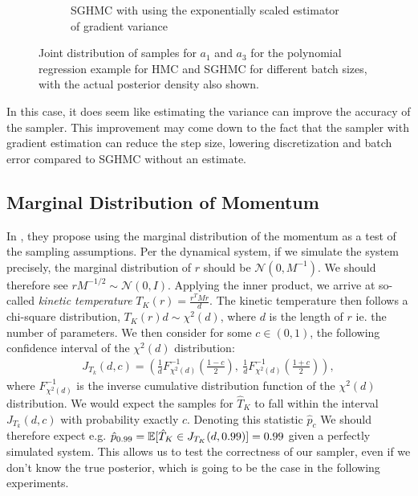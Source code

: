 \begin{figure}[htbp]
\begin{subfigure}[t]{0.45\linewidth}
        \caption{SGHMC with using the exponentially scaled estimator of gradient variance}
    \end{subfigure}
    \caption{Joint distribution of samples for $a_1$ and $a_3$ for the polynomial regression example for HMC and SGHMC for different batch sizes, with the actual posterior density also shown.}
    \label{fig:simualted_var_est_joint_comp}
\end{figure}
In this case, it does seem like estimating the variance can improve the accuracy of the sampler.
This improvement may come down to the fact that the sampler with gradient estimation can reduce the step size, lowering discretization and batch error compared to SGHMC without an estimate. 

\subsection{Marginal Distribution of Momentum}

In \autocite{wenzel_how_2020}, they propose using the marginal distribution of the momentum as a test of the sampling assumptions. 
Per the dynamical system, if we simulate the system precisely, the marginal distribution of $r$ should be $\mathcal{N}(0, M^{-1})$. 
We should therefore see $r M^{-1/2} \sim \mathcal{N}(0, I)$. 
Applying the inner product, we arrive at so-called \emph{kinetic temperature} $T_K(r) = \frac{r^T M r}{d}$.
The kinetic temperature then follows a chi-square distribution, $T_K(r)d\sim \chi^2(d)$, where $d$ is the length of $r$ ie. the number of parameters. 
We then consider for some $c\in (0, 1)$, the following confidence interval of  the $\chi^2(d)$ distribution:
\begin{align}
    J_{T_k}(d, c) = \left(\frac{1}{d} F_{\chi^2(d)}^{-1}\left( \frac{1-c}{2} \right),~\frac{1}{d} F_{\chi^2(d)}^{-1}\left(\frac{1+c}{2}\right)\right),
\end{align}
where $F_{\chi^2(d)}^{-1}$ is the inverse cumulative distribution function of the $\chi^2(d)$ distribution.
We would expect the samples for $\hat{T}_K$ to fall within the interval $J_{T_k}(d, c)$ with probability exactly $c$. 
Denoting this statistic $\hat{p}_{c}$
We should therefore expect e.g. $\hat{p}_{0.99}=\operatorname{\mathbb{E}}[\hat{T}_K \in J_{T_K}(d, {0.99})] = 0.99$ given a perfectly simulated system.
This allows us to test the correctness of our sampler, even if we don't know the true posterior, which is going to be the case in the following experiments.

